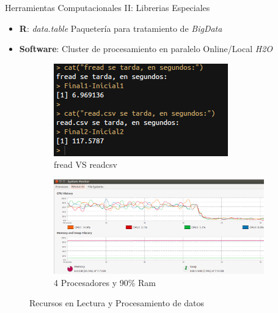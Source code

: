 \documentclass{bredelebeamer}
\begin{document}
\begin{frame}{Herramientas Computacionales II: Librerias Especiales}

\begin{itemize}

  \item \textbf{R}: \textit{data.table} Paqueter\'ia para tratamiento de \textit{BigData}
  \item \textbf{Software}: Cluster de procesamiento en paralelo Online/Local \textit{H2O}
  
\end{itemize}

\begin{figure}
\centering
\begin{subfigure}{.5\textwidth}
  \centering
  \includegraphics[width=.9\linewidth]{images/freadVSreadcsv.png}
  \caption{fread VS readcsv}
\end{subfigure}%
\begin{subfigure}{.5\textwidth}
  \centering
  \includegraphics[width=1.1\linewidth]{images/H2O.png}
  \caption{4 Procesadores y 90\% Ram}
\end{subfigure}

\vspace{1cm}

\caption{Recursos en Lectura y Procesamiento de datos}
\end{figure}

\end{frame}
\end{document}
